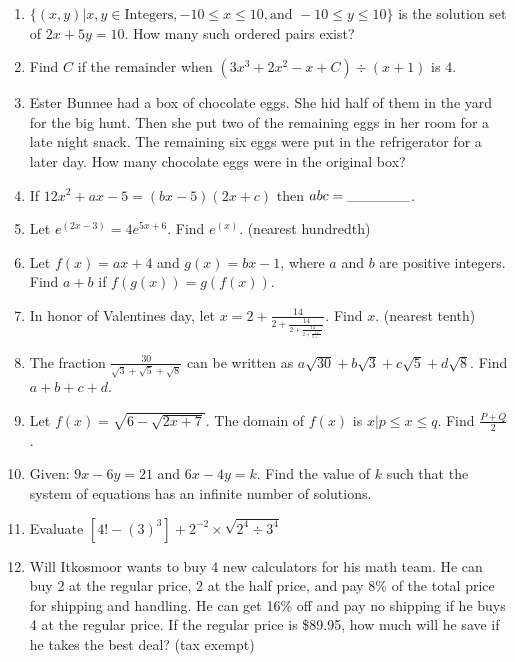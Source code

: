 \documentclass[../uilmath.tex]{subfiles}
\begin{document}
\begin{enumerate}[label=\bfseries\arabic*.]
        \item %
        $\{(x,y)|x,y \in {\text{Integers}}, -10\leq x\leq 10, \text{and } -10\leq y\leq 10\}$ is the solution set of $2x+5y=10$. How many such ordered pairs exist?

        \item %
        Find $C$ if the remainder when $(3x^3+2x^2-x+C)\div (x+1)$ is $4$.

        \item %
        Ester Bunnee had a box of chocolate eggs. She hid half of them in the yard for the big hunt.
        Then she put two of the remaining eggs in her room for a late night snack. The remaining six eggs were put in the refrigerator 
        for a later day. How many chocolate eggs were in the original box?

        \item %
        If $12x^2+ax-5=(bx-5)(2x+c)$ then $abc=\_\_\_\_\_\_$.

        \item %
        Let $e^{(2x-3)}=4e^{5x+6}$. Find $e^{(x)}$. (nearest hundredth)

        \item %
        Let $f(x)=ax+4$ and $g(x)=bx-1$, where $a$ and $b$ are positive integers. Find $a+b$ if 
        $f(g(x))=g(f(x))$.

        \item %
        In honor of Valentines day, let $x=2+\frac{14}{2+\frac{14}{2+\frac{14}{2+\frac{14}{2+\dots}}}}$. Find $x$. (nearest tenth)

        \item %
        The fraction $\frac{30}{\sqrt{3}+\sqrt{5}+\sqrt{8}}$ can be written as $a\sqrt{30}+b\sqrt{3}+c\sqrt{5}+d\sqrt{8}$. Find $a+b+c+d$.

        \item %
        Let $f(x)=\sqrt{6-\sqrt{2x+7}}$. The domain of $f(x)$ is ${x|p\leq x\leq q}$. Find $\frac{P+Q}{2}$.

        \item %
        Given: $9x-6y=21$ and $6x-4y=k$. Find the value of $k$ such that the system of equations has an infinite number of solutions.

        \item %
        Evaluate $[4!-(3)^3]+2^{-2}\times \sqrt{2^4\div 3^4}$

        \item %
        Will Itkosmoor wants to buy 4 new calculators for his math team. He can buy 2 at the regular price, 2 at the half price, and pay 
        8\% of the total price for shipping and handling. He can get 16\% off and pay no shipping if he buys 4 at the regular price.
        If the regular price is \$89.95, how much will he save if he takes the best deal? (tax exempt)


\end{enumerate}
\end{document}
